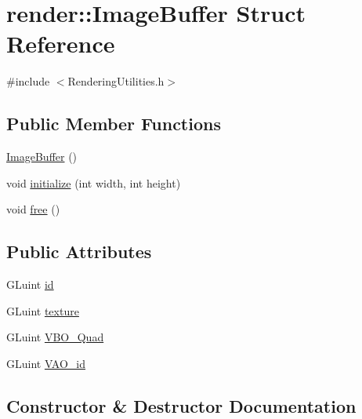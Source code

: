 \hypertarget{structrender_1_1_image_buffer}{}\section{render\+:\+:Image\+Buffer Struct Reference}
\label{structrender_1_1_image_buffer}


{\ttfamily \#include $<$Rendering\+Utilities.\+h$>$}

\subsection*{Public Member Functions}
\begin{DoxyCompactItemize}
\item 
\hyperlink{structrender_1_1_image_buffer_aa1565381fd26e8557b9dab30e6490179}{Image\+Buffer} ()
\item 
void \hyperlink{structrender_1_1_image_buffer_a04451aea8162180476f98b59d793eff4}{initialize} (int width, int height)
\item 
void \hyperlink{structrender_1_1_image_buffer_a61e325dc8cc59cbb4848c576d5ca0972}{free} ()
\end{DoxyCompactItemize}
\subsection*{Public Attributes}
\begin{DoxyCompactItemize}
\item 
G\+Luint \hyperlink{structrender_1_1_image_buffer_a5eb359e2da33efc3431498da51c9c835}{id}
\item 
G\+Luint \hyperlink{structrender_1_1_image_buffer_ad7388b16adfbf213a0c4b034cc9e1b1b}{texture}
\item 
G\+Luint \hyperlink{structrender_1_1_image_buffer_aebf2fbc32627fe92db9249ba45211f6d}{V\+B\+O\+\_\+\+Quad}
\item 
G\+Luint \hyperlink{structrender_1_1_image_buffer_a19730c873417ad42b078ca417fd0e9c0}{V\+A\+O\+\_\+id}
\end{DoxyCompactItemize}


\subsection{Constructor \& Destructor Documentation}
